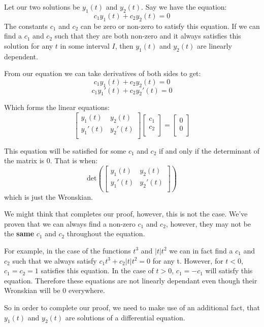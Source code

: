 \documentclass{report}
\begin{document}
{Let our two solutions be $y_1(t)$ and $y_2(t)$. Say we have the equation:
$$c_1y_1(t) +c_2y_2(t) = 0$$
The constants $c_1$ and $c_2$ can be zero or non-zero to satisfy this equation. If we can find a $c_1$ and $c_2$ such that they are both non-zero and it always satisfies this solution for any $t$ in some interval $I$, then $y_1(t)$ and $y_2(t)$ are linearly dependent.

From our equation we can take derivatives of both sides to get:
$$c_1y_1(t) +c_2y_2(t) = 0$$
$$c_1y_1'(t) +c_2y_2'(t) = 0$$

Which forms the linear equations:
$$
\begin{bmatrix}
    y_1(t) & y_2(t) \\
    y_1'(t) & y_2'(t) \\
\end{bmatrix}
\begin{bmatrix}
    c_1 \\
    c_2 \\
\end{bmatrix}
=
\begin{bmatrix}
    0 \\
    0 \\
\end{bmatrix}
$$

This equation will be satisfied for some $c_1$ and $c_2$ if and only if the determinant of the matrix is 0. That is when:
$$
\text{det}\left(\begin{bmatrix}
        y_1(t) & y_2(t) \\
        y_1'(t) & y_2'(t) \\
        \end{bmatrix}\right)
$$
which is just the Wronskian.

We might think that completes our proof, however, this is not the case. We've proven that we can always find a non-zero $c_1$ and $c_2$, however, they may not be the \textbf{same} $c_1$ and $c_2$ throughout the equation. 

For example, in the case of the functions $t^3$ and $|t|t^2$ we can in fact find a $c_1$ and $c_2$ such that we always satisfy $c_1t^3+c_2|t|t^2=0$ for any t. However, for $t < 0$, $c_1=c_2=1$ satisfies this equation. In the case of $t>0$, $c_1=-c_1$ will satisfy this equation. Therefore these equations are not linearly dependant even though their Wronskian will be 0 everywhere.

So in order to complete our proof, we need to make use of an additional fact, that $y_1(t)$ and $y_2(t)$ are solutions of a differential equation. 

}
\end{document}

